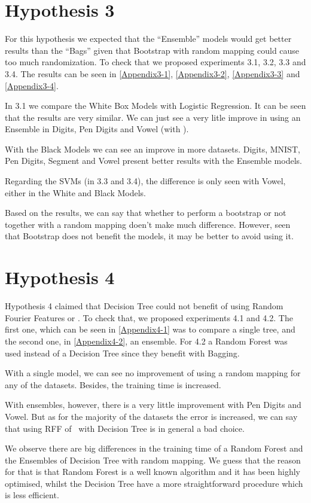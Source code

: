 \begin{pre-delivery}
\section*{Hypothesis 3}
\label{disc:h3}

For this hypothesis we expected that the ``Ensemble'' models would get
better results than the ``Bags'' given that Bootstrap with random mapping
could cause too much randomization. To check that we proposed experiments
3.1, 3.2, 3.3 and 3.4. The results can be seen in
\ref{Appendix3-1},
\ref{Appendix3-2},
\ref{Appendix3-3} and
\ref{Appendix3-4}.

In 3.1 we compare the White Box Models with Logistic Regression. It can be seen
that the results are very similar. We can just see a very litle improve in using
an Ensemble in Digits, Pen Digits and Vowel (with \Nys).

With the Black Models we can see an improve in more datasets.
Digits, MNIST, Pen Digits, Segment and Vowel present better results with the
Ensemble models.

Regarding the SVMs (in 3.3 and 3.4), the difference is only seen with Vowel,
either in the White and Black Models.

Based on the results, we can say that whether to perform a bootstrap or not
together with a random mapping doen't make much difference. However, seen
that Bootstrap does not benefit the models, it may be better to avoid using
it.

\section*{Hypothesis 4}
\label{disc:h4}
Hypothesis 4 claimed that Decision Tree could not benefit of using
Random Fourier Features or \Nys. To check that, we proposed experiments
4.1 and 4.2. The first one, which can be seen in \ref{Appendix4-1} was
to compare a single tree, and the second one, in \ref{Appendix4-2}, an
ensemble. For 4.2 a Random Forest was used instead of a Decision Tree since
they benefit with Bagging.

With a single model, we can see no improvement of using a random mapping for
any of the datasets. Besides, the training time is increased.

With ensembles, however, there is a very little improvement with
Pen Digits and Vowel. But as for the majority of the datasets the error is
increased, we can say that using RFF of \Nys\ with Decision Tree is in
general a bad choice.

We observe there are big differences in the training time of a Random Forest
and the Ensembles of Decision Tree with random mapping. We guess that the
reason for that is that Random Forest is a well known algorithm and it has
been highly optimised, whilst the Decision Tree have a more straightforward
procedure which is less efficient.

\end{pre-delivery}

